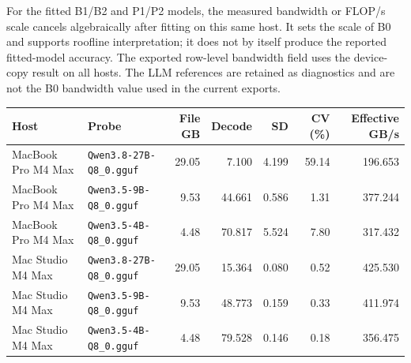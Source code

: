 \documentclass[10pt]{article}
\begin{document}
For the fitted B1/B2 and P1/P2 models, the measured bandwidth or FLOP/s scale cancels algebraically after fitting on this same host. It sets the scale of B0 and supports roofline interpretation; it does not by itself produce the reported fitted-model accuracy. The exported row-level bandwidth field uses the device-copy result on all hosts. The LLM references are retained as diagnostics and are not the B0 bandwidth value used in the current exports.
\begin{center}
\small
\begin{tabular}{llrrrrr}
\toprule
Host & Probe & File GB & Decode & SD & CV (\%) & Effective GB/s\\
\midrule
MacBook Pro M4 Max & \nolinkurl{Qwen3.8-27B-Q8_0.gguf} & 29.05 & 7.100 & 4.199 & 59.14 & 196.653 \\
MacBook Pro M4 Max & \nolinkurl{Qwen3.5-9B-Q8_0.gguf} & 9.53 & 44.661 & 0.586 & 1.31 & 377.244 \\
MacBook Pro M4 Max & \nolinkurl{Qwen3.5-4B-Q8_0.gguf} & 4.48 & 70.817 & 5.524 & 7.80 & 317.432 \\
Mac Studio M4 Max & \nolinkurl{Qwen3.8-27B-Q8_0.gguf} & 29.05 & 15.364 & 0.080 & 0.52 & 425.530 \\
Mac Studio M4 Max & \nolinkurl{Qwen3.5-9B-Q8_0.gguf} & 9.53 & 48.773 & 0.159 & 0.33 & 411.974 \\
Mac Studio M4 Max & \nolinkurl{Qwen3.5-4B-Q8_0.gguf} & 4.48 & 79.528 & 0.146 & 0.18 & 356.475 \\
\bottomrule
\end{tabular}
\end{center}
\end{document}
